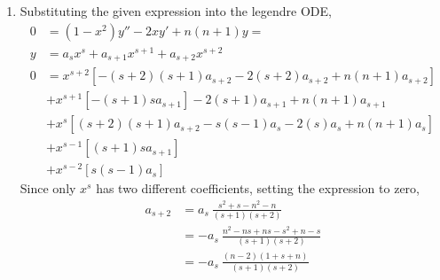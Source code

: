 \begin{enumerate}
    \item Substituting the given expression into the legendre ODE,
          \begin{align}
              0 & = (1-x^2)y'' - 2xy' + n(n+1)y =                                \\
              y & = a_s x^s + a_{s+1}x^{s+1} + a_{s+2}x^{s+2}                    \\
              0 & = x^{s+2} [-(s+2)(s+1)a_{s+2} - 2(s+2)a_{s+2} + n(n+1)a_{s+2}] \\
                & + x^{s+1} [-(s+1)s a_{s+1}] - 2(s+1)a_{s+1} + n(n+1)a_{s+1}    \\
                & + x^s [(s+2)(s+1)a_{s+2} - s(s-1)a_s - 2(s)a_s
              + n(n+1)a_s ]                                                      \\
                & + x^{s-1} [(s+1)s a_{s+1}]                                     \\
                & + x^{s-2} [s(s-1)a_s]
          \end{align}
          Since only $ x^s $ has two different coefficients, setting the expression
          to zero,
          \begin{align}
              a_{s+2} & = a_s\ \frac{s^2 + s - n^2 - n}{(s+1)(s+2)}            \\
                      & = -a_s\ \frac{n^2 - ns + ns - s^2 + n - s}{(s+1)(s+2)} \\
                      & = -a_s\ \frac{(n-2)(1 + s + n)}{(s+1)(s+2)}
          \end{align}


\end{enumerate}
